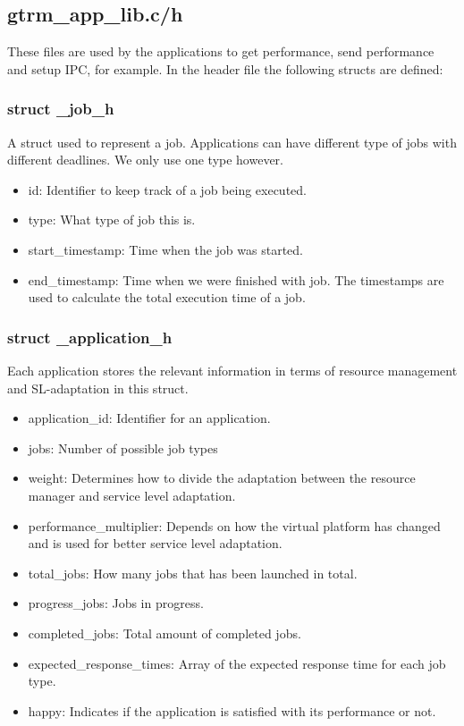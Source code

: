 \documentclass[nobiblatex]{LTHthesis}
\begin{document}
\subsection{gtrm\_app\_lib.c/h}
These files are used by the applications to get performance, send performance and setup IPC, for example.
In the header file the following structs are defined:
\subsubsection{struct \_job\_h}
A struct used to represent a job. Applications can have different type of jobs with different deadlines. We only use one type however.
\begin{itemize}
\item id: Identifier to keep track of a job being executed.
\item type: What type of job this is.
\item start\_timestamp: Time when the job was started.
\item end\_timestamp: Time when we were finished with job. The timestamps are used to calculate the total execution time of a job.
\end{itemize}

\subsubsection{struct \_application\_h}
Each application stores the relevant information in terms of resource management and SL-adaptation in this struct.
\begin{itemize}
\item application\_id: Identifier for an application.
\item jobs: Number of possible job types
\item weight: Determines how to divide the adaptation between the resource manager and service level adaptation.
\item performance\_multiplier: Depends on how the virtual platform has changed and is used for better service level adaptation.
\item total\_jobs: How many jobs that has been launched in total.
\item progress\_jobs: Jobs in progress.
\item completed\_jobs: Total amount of completed jobs.
\item expected\_response\_times: Array of the expected response time for each job type.
\item happy: Indicates if the application is satisfied with its performance or not.
\end{itemize}
\end{document}
